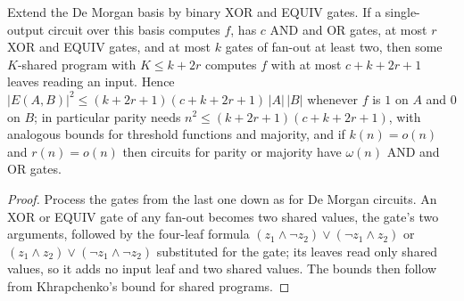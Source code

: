 \begin{theorem}
  \label{thm:lowerbounds-algebraic-khrapchenko-shared-xor}
  \leanok
  Extend the De Morgan basis by binary XOR and EQUIV gates. If a single-output
  circuit over this basis computes $f$, has $c$ AND and OR gates, at most $r$
  XOR and EQUIV gates, and at most $k$ gates of fan-out at least two, then some
  $K$-shared program with $K \le k + 2r$ computes $f$ with at most
  $c + k + 2r + 1$ leaves reading an input. Hence
  $|E(A,B)|^2 \le (k + 2r + 1)(c + k + 2r + 1)\,|A|\,|B|$ whenever $f$ is $1$ on
  $A$ and $0$ on $B$; in particular parity needs
  $n^2 \le (k + 2r + 1)(c + k + 2r + 1)$, with analogous bounds for threshold
  functions and majority, and if $k(n) = o(n)$ and $r(n) = o(n)$ then circuits
  for parity or majority have $\omega(n)$ AND and OR gates.
\end{theorem}
\begin{proof}
  \leanok
  Process the gates from the last one down as for De Morgan circuits. An XOR
  or EQUIV gate of any fan-out becomes two shared values, the gate's two
  arguments, followed by the four-leaf formula
  $(z_1 \wedge \neg z_2) \vee (\neg z_1 \wedge z_2)$ or
  $(z_1 \wedge z_2) \vee (\neg z_1 \wedge \neg z_2)$ substituted for the gate;
  its leaves read only shared values, so it adds no input leaf and two shared
  values. The bounds then follow from Khrapchenko's bound for shared programs.
\end{proof}

